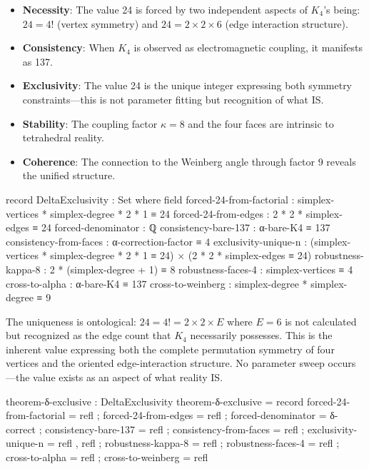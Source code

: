 \documentclass[11pt,a4paper]{book}
\begin{document}
\begin{itemize}
\item \textbf{Necessity}: The value 24 is forced by two independent aspects of $K_4$'s being: $24 = 4!$ (vertex symmetry) and $24 = 2 \times 2 \times 6$ (edge interaction structure).
\item \textbf{Consistency}: When $K_4$ is observed as electromagnetic coupling, it manifests as 137.
\item \textbf{Exclusivity}: The value 24 is the unique integer expressing both symmetry constraints—this is not parameter fitting but recognition of what IS.
\item \textbf{Stability}: The coupling factor $\kappa = 8$ and the four faces are intrinsic to tetrahedral reality.
\item \textbf{Coherence}: The connection to the Weinberg angle through factor 9 reveals the unified structure.
\end{itemize}

\begin{code}
record DeltaExclusivity : Set where
  field
    forced-24-from-factorial   : simplex-vertices * simplex-degree * 2 * 1 ≡ 24
    forced-24-from-edges       : 2 * 2 * simplex-edges ≡ 24
    forced-denominator         : ℚ
    consistency-bare-137       : α-bare-K4 ≡ 137
    consistency-from-faces     : α-correction-factor ≡ 4
    exclusivity-unique-n       : (simplex-vertices * simplex-degree * 2 * 1 ≡ 24) × (2 * 2 * simplex-edges ≡ 24)
    robustness-kappa-8         : 2 * (simplex-degree + 1) ≡ 8
    robustness-faces-4         : simplex-vertices ≡ 4
    cross-to-alpha             : α-bare-K4 ≡ 137
    cross-to-weinberg          : simplex-degree * simplex-degree ≡ 9
\end{code}

The uniqueness is ontological: $24 = 4! = 2 \times 2 \times E$ where $E = 6$ is not calculated but recognized as the edge count that $K_4$ necessarily possesses. This is the inherent value expressing both the complete permutation symmetry of four vertices and the oriented edge-interaction structure. No parameter sweep occurs—the value exists as an aspect of what reality IS.

\begin{code}
theorem-δ-exclusive : DeltaExclusivity
theorem-δ-exclusive = record
  { forced-24-from-factorial = refl
  ; forced-24-from-edges = refl
  ; forced-denominator = δ-correct
  ; consistency-bare-137 = refl
  ; consistency-from-faces = refl
  ; exclusivity-unique-n = refl , refl
  ; robustness-kappa-8 = refl
  ; robustness-faces-4 = refl
  ; cross-to-alpha = refl
  ; cross-to-weinberg = refl
  }

\end{code}
\end{document}

